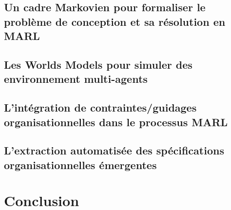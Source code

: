 \section{Un cadre Markovien pour formaliser le problème de conception et sa résolution en MARL}
\section{Les Worlds Models pour simuler des environnement multi-agents}
\section{L'intégration de contraintes/guidages organisationnelles dans le processus MARL}
\section{L'extraction automatisée des spécifications organisationnelles émergentes}

\chapter*{Conclusion}
